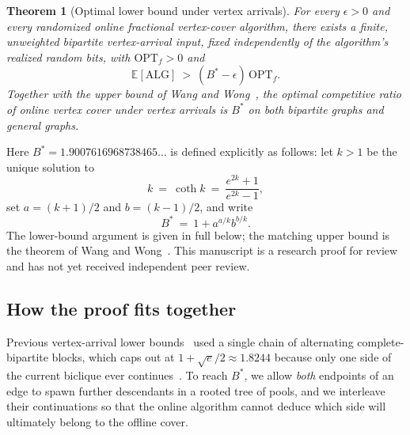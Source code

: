 \documentclass[11pt,letterpaper]{article}
\newtheorem{theorem}{Theorem}
\begin{document}
\begin{theorem}[Optimal lower bound under vertex arrivals]\label{thm:main}
For every $\epsilon>0$ and every randomized online fractional vertex-cover algorithm, there exists a finite, unweighted bipartite vertex-arrival input, fixed independently of the algorithm's realized random bits, with $\mathrm{OPT}_f>0$ and
\[
  \mathbb E[\mathrm{ALG}]\ >\ (B^*-\epsilon)\,\mathrm{OPT}_f .
\]
Together with the upper bound of Wang and Wong~\cite{ww}, the optimal competitive ratio of online vertex cover under vertex arrivals is $B^*$ on both bipartite graphs and general graphs.
\end{theorem}

Here $B^*=1.9007616968738465\ldots$ is defined explicitly as follows: let $k>1$ be the unique solution to
\[
  k\ =\ \coth k\ =\ \frac{e^{2k}+1}{e^{2k}-1},
\]
set $a=(k+1)/2$ and $b=(k-1)/2$, and write
\[
  B^*\ =\ 1 + a^{a/k}b^{b/k} .
\]
The lower-bound argument is given in full below; the matching upper bound is the theorem of Wang and Wong~\cite{ww}. This manuscript is a research proof for review and has not yet received independent peer review.

\subsection*{How the proof fits together}

Previous vertex-arrival lower bounds~\cite{ww,lu} used a single chain of alternating complete-bipartite blocks, which caps out at $1+\sqrt{e}/2\approx 1.8244$ because only one side of the current biclique ever continues~\cite{lu}. To reach $B^*$, we allow \emph{both} endpoints of an edge to spawn further descendants in a rooted tree of pools, and we interleave their continuations so that the online algorithm cannot deduce which side will ultimately belong to the offline cover.
\end{document}

